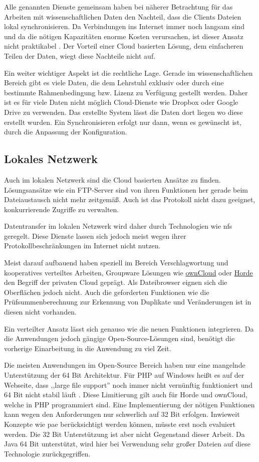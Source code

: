 \documentclass[oneside, ngerman, toc=bibliography,bibliography=totoc,listof=entryprefix, open=right,numbers=noenddot,fontsize=12pt]{scrbook}
\begin{document}
Alle genannten Dienste gemeinsam haben bei näherer Betrachtung für das Arbeiten mit wissenschaftlichen Daten den Nachteil, dass die Clients Dateien lokal synchronisieren. Da Verbindungen ins Internet immer noch langsam sind und da die nötigen Kapazitäten enorme Kosten verursachen, ist dieser Ansatz nicht praktikabel \cite{telekomlahr}. Der Vorteil einer Cloud basierten Lösung, dem einfacheren Teilen der Daten, wiegt diese Nachteile nicht auf.

Ein weiter wichtiger Aspekt ist die rechtliche Lage. Gerade im wissenschaftlichen Bereich gibt es viele Daten, die dem Lehrstuhl exklusiv oder durch eine bestimmte Rahmenbedingung bzw. Lizenz zu Verfügung gestellt werden. 
Daher ist es für viele Daten nicht möglich Cloud-Dienste wie Dropbox oder Google Drive zu verwenden. 
Das erstellte System lässt die Daten dort liegen wo diese erstellt wurden. Ein Synchronisieren erfolgt nur dann, wenn es gewünscht ist, durch die Anpassung der Konfiguration.

\subsection{Lokales Netzwerk}
Auch im lokalen Netzwerk sind die Cloud basierten Ansätze zu finden. Lösungsansätze wie ein FTP-Server sind von ihren Funktionen her gerade beim Dateiaustausch nicht mehr zeitgemäß. Auch ist das Protokoll nicht dazu geeignet, konkurrierende Zugriffe zu verwalten.

Datentransfer im lokalen Netzwerk wird daher durch Technologien wie \acrshort{nfs} geregelt.
Diese Dienste lassen sich jedoch meist wegen ihrer Protokollbeschränkungen im Internet nicht nutzen.

Meist darauf aufbauend haben speziell im Bereich Verschlagwortung und kooperatives verteiltes Arbeiten, Groupware Lösungen wie \href{https://owncloud.org/}{{ownCloud}} oder \href{http://www.horde.org/apps/groupware}{{Horde}} den Begriff der privaten Cloud geprägt. Als Dateibrowser eignen sich die Oberflächen jedoch nicht. Auch die geforderten Funktionen wie die Prüfsummenberechnung zur Erkennung von Duplikate und Veränderungen ist in diesen nicht vorhanden.

Ein verteilter Ansatz lässt sich genauso wie die neuen Funktionen integrieren. Da die Anwendungen jedoch gängige Open-Source-Lösungen sind, benötigt die vorherige Einarbeitung in die Anwendung zu viel Zeit. 

Die meisten Anwendungen im Open-Source Bereich haben nur eine mangelnde Unterstützung der 64 Bit Architektur. Für PHP auf Windows heißt es auf der Webseite, dass ,,large file support'' noch immer nicht vernünftig funktioniert und 64 Bit nicht stabil läuft \cite{phpw}. Diese Limitierung gilt auch für Horde und ownCloud, welche in PHP programmiert sind. Eine Implementierung der nötigen Funktionen kann wegen den Anforderungen nur schwerlich auf 32 Bit erfolgen. Inwieweit Konzepte wie \acrfull{pae} berücksichtigt werden können, müsste erst noch evaluiert werden. Die 32 Bit Unterstützung ist aber nicht Gegenstand dieser Arbeit.
Da Java 64 Bit unterstützt, wird hier bei Verwendung sehr großer Dateien auf diese Technologie zurückgegriffen.
\end{document}
